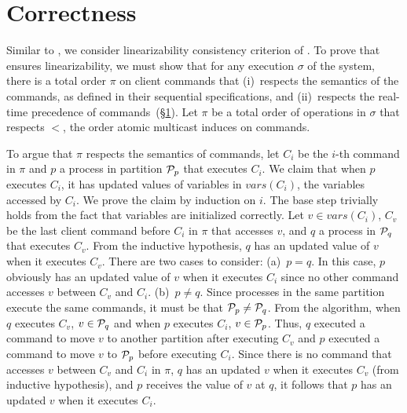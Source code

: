 \section{Correctness}
\label{sec:dynastar-correctness}

Similar to \dssmr, we consider linearizability consistency criterion of
\dynastar. To prove that \dynastar ensures linearizability, we must show that
for any execution $\sigma$ of the system, there is a total order $\pi$ on client
commands that (i)~respects the semantics of the commands, as defined in their
sequential specifications, and (ii)~respects the real-time precedence of
commands~(\S\ref{sec:dynastar-correctness}).
%
Let $\pi$ be a total order of operations in $\sigma$ that respects $<$, the
order atomic multicast induces on commands.

To argue that $\pi$ respects the semantics of  commands, let $C_i$ be the $i$-th
command in $\pi$ and $p$ a process in partition $\mathcal{P}_p$ that executes $C_i$.
We claim that when $p$ executes $C_i$, it has updated values of variables in
$vars(C_i)$, the variables accessed by $C_i$. We prove the claim by induction on
$i$. The base step trivially holds from the fact that variables are initialized
correctly. Let $v \in vars(C_i)$, $C_v$ be the last client command before $C_i$
in $\pi$ that accesses $v$, and $q$ a process in $\mathcal{P}_q$ that executes $C_v$.
From the inductive hypothesis, $q$ has an updated value of $v$ when it executes
$C_v$. There are two cases to consider: (a)~$p = q$. In this case, $p$ obviously
has an updated value of $v$ when it executes $C_i$ since no other command
accesses $v$ between $C_v$ and $C_i$. (b)~$p \neq q$. Since processes in the
same partition execute the same commands, it must be that $\mathcal{P}_p \neq \mathcal{P}_q$.
From the algorithm, when $q$ executes $C_v$, $v \in \mathcal{P}_q$ and when $p$
executes $C_i$, $v \in \mathcal{P}_p$. Thus, $q$ executed a command to move $v$ to
another partition after executing $C_v$ and $p$ executed a command to move $v$
to $\mathcal{P}_p$ before executing $C_i$. Since there is no command that accesses $v$
between $C_v$ and $C_i$ in $\pi$, $q$ has an updated $v$ when it executes $C_v$
(from inductive hypothesis), and $p$ receives the value of $v$ at $q$, it
follows that $p$ has an updated $v$ when it executes $C_i$.

